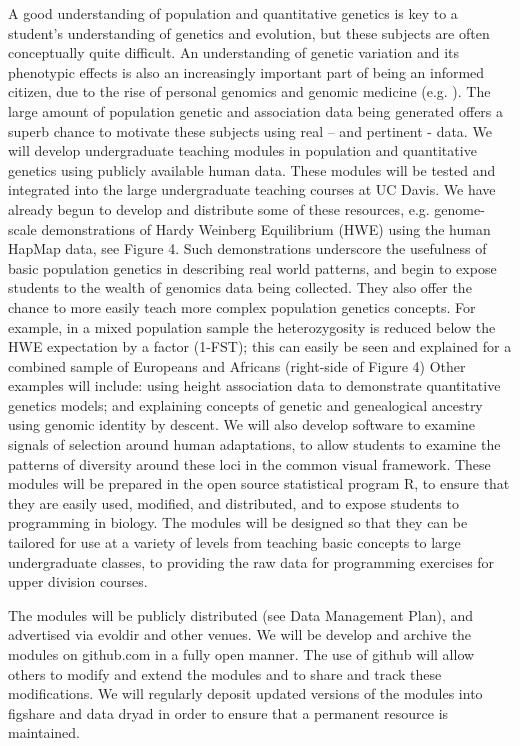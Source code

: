 A good understanding of population and quantitative genetics is key to a student’s understanding of genetics and evolution, but these subjects are often conceptually quite difficult. An understanding of genetic variation and its phenotypic effects is also an increasingly important part of being an informed citizen, due to the rise of personal genomics and genomic medicine (e.g. ). The large amount of population genetic and association data being generated offers a superb chance to motivate these subjects using real – and pertinent - data. 
We will develop undergraduate teaching modules in population and quantitative genetics using publicly available human data. These modules will be tested and integrated into the large undergraduate teaching courses at UC Davis. We have already begun to develop and distribute some of these resources, e.g. genome-scale demonstrations of Hardy Weinberg Equilibrium (HWE) using the human HapMap data, see Figure 4. Such demonstrations underscore the usefulness of basic population genetics in describing real world patterns, and begin to expose students to the wealth of genomics data being collected. They also offer the chance to more easily teach more complex population genetics concepts. For example, in a mixed population sample the heterozygosity is reduced below the HWE expectation by a factor (1-FST); this can easily be seen and explained for a combined sample of Europeans and Africans (right-side of Figure 4)
Other examples will include: using height association data to demonstrate quantitative genetics models; and explaining concepts of genetic and genealogical ancestry using genomic identity by descent. We will also develop software to examine signals of selection around human adaptations, to allow students to examine the patterns of diversity around these loci in the common visual framework. These modules will be prepared in the open source statistical program R, to ensure that they are easily used, modified, and distributed, and to expose students to programming in biology. The modules will be designed so that they can be tailored for use at a variety of levels from teaching basic concepts to large undergraduate classes, to providing the raw data for programming exercises for upper division courses.

The modules will be publicly distributed (see Data Management Plan), and advertised via evoldir and other venues. We will be develop and archive the modules on github.com in a fully open manner. The use of github will allow others to modify and extend the modules and to share and track these modifications. We will regularly deposit updated versions of the modules into figshare and data dryad in order to ensure that a permanent resource is maintained. 

